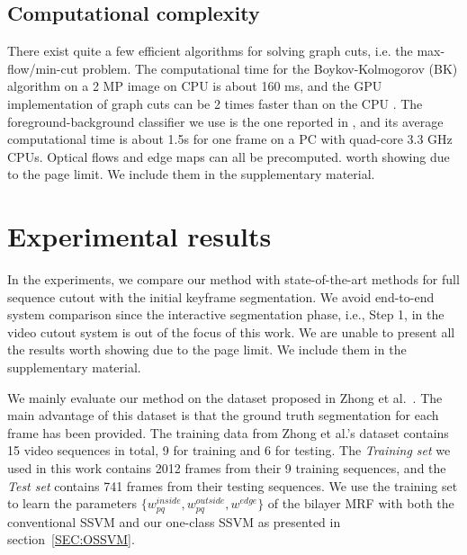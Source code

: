 \documentclass[10pt,journal,compsoc]{newIEEEtran}
\begin{document}
\subsection{Computational complexity}
There exist quite a few efficient algorithms for solving graph cuts, i.e. the max-flow/min-cut problem. The computational time for the Boykov-Kolmogorov (BK) algorithm on a 2 MP image on CPU is about 160 ms, and the GPU implementation of graph cuts can be 2 times faster than on the CPU \cite{vineet2008cuda}. The foreground-background classifier we use is the one reported in \cite{Zhong2012UDC_SIGGRAPHAsia}, and its average computational time is about 1.5s for one frame on a PC with quad-core 3.3 GHz CPUs. Optical flows and edge maps can all be precomputed.
 worth showing due to the page limit. We include them in the supplementary material.
\section{Experimental results}\label{sec:experiment}
In the experiments, we compare our method with state-of-the-art methods for full sequence cutout with the initial keyframe segmentation. We avoid end-to-end system comparison since the interactive segmentation phase, i.e., Step 1, in the video cutout system is out of the focus of this work. We are unable to present all the results worth showing due to the page limit. We include them in the supplementary material.

We mainly evaluate our method on the dataset proposed in Zhong et al.~\cite{Zhong2012UDC_SIGGRAPHAsia}. The main advantage of this dataset is that the ground truth segmentation for each frame has been provided. The training data from Zhong et al.'s dataset contains 15 video sequences in total, 9 for training and 6 for testing. The \emph{Training set} we used in this work contains 2012 frames from their 9 training sequences, and the \emph{Test set} contains 741 frames from their testing sequences.%
We use the training set to learn the parameters $\{w^{inside}_{pq},w^{outside}_{pq},w^{edge}\}$ of the bilayer MRF with both the conventional SSVM and our one-class SSVM as presented in section~\ref{SEC:OSSVM}.
\end{document}
